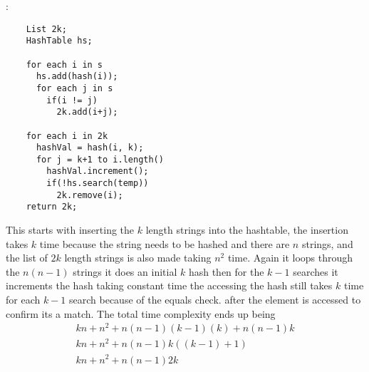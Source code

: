 \documentclass[11pt]{article}
\newcommand\head[1]{\noindent{\large\textbf{#1}}:\newline}
\begin{document}
  \head{WarWithRollHash}
  \begin{verbatim}
    List 2k;
    HashTable hs;

    for each i in s
      hs.add(hash(i));
      for each j in s
        if(i != j)
          2k.add(i+j);

    for each i in 2k
      hashVal = hash(i, k);
      for j = k+1 to i.length()
        hashVal.increment();
        if(!hs.search(temp))
          2k.remove(i);
    return 2k;
  \end{verbatim}
  This starts with inserting the $k$ length strings into the hashtable, the insertion takes $k$ time because the string needs to be hashed
   and there are $n$ strings, and the list of $2k$ length strings is
  also made taking $n^2$ time. Again it loops through the $n(n-1)$ strings it does an initial $k$ hash then for the $k-1$ searches it increments the hash taking constant time
  the accessing the hash still takes $k$ time for each $k-1$ search because of the equals check.
  after the element is accessed to confirm its a match. The total time complexity ends up being
  \begin{align*} 
    kn + n^2 + n(n-1)(k-1)(k) + n(n-1)k\\
    kn + n^2 + n(n-1)k((k-1) + 1)\\
    kn + n^2 + n(n-1)2k
  \end{align*}
\end{document}
